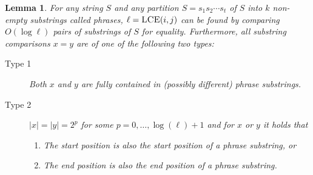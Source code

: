 \documentclass[11pt]{article}
\newtheorem{lemma}{Lemma}
\newcommand{\lceq}{\ensuremath{\textsc{LCE}}}
\begin{document}
\begin{lemma}\label{lem:lce-comparisons}
For any string $S$ and any partition $S=s_1 s_2 \cdots s_t$ of $S$ into $k$ non-empty substrings called phrases, $\ell=\lceq(i,j)$ can be found by comparing $O(\log \ell)$ pairs of substrings of $S$ for equality. Furthermore, all substring comparisons $x=y$ are of one of the following two types:
\begin{description}
\item[Type 1] Both $x$ and $y$ are fully contained in (possibly different) phrase substrings.
\item[Type 2] $|x|=|y|=2^p$ for some $p=0,\ldots,\log(\ell)+1$ and for $x$ or $y$ it holds that
\begin{enumerate}
\item[(a)] The start position is also the start position of a phrase substring, or
\item[(b)] The end position is also the end position of a phrase substring.
\end{enumerate}
\end{description}
\end{lemma}
\end{document}
